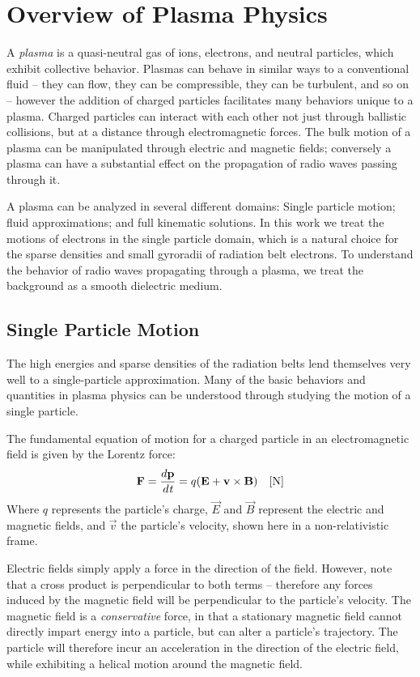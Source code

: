 \section{Overview of Plasma Physics}
A \emph{plasma} is a quasi-neutral gas of ions, electrons, and neutral particles, which exhibit collective behavior. Plasmas can behave in similar ways to a conventional fluid -- they can flow, they can be compressible, they can be turbulent, and so on -- however the addition of charged particles facilitates many behaviors unique to a plasma. Charged particles can interact with each other not just through ballistic collisions, but at a distance through electromagnetic forces. The bulk motion of a plasma can be manipulated through electric and magnetic fields; conversely a plasma can have a substantial effect on the propagation of radio waves passing through it. 

A plasma can be analyzed in several different domains: Single particle motion; fluid approximations; and full kinematic solutions. In this work we treat the motions of electrons in the single particle domain, which is a natural choice for the sparse densities and small gyroradii of radiation belt electrons. To understand the behavior of radio waves propagating through a plasma, we treat the background as a smooth dielectric medium. 

\subsection{Single Particle Motion}
\label{section:single_particle_motion}
The high energies and sparse densities of the radiation belts lend themselves very well to a single-particle approximation. Many of the basic behaviors and quantities in plasma physics can be understood through studying the motion of a single particle.

The fundamental equation of motion for a charged particle in an electromagnetic field is given by the Lorentz force:
\begin{equation}
\mathbf{F} = \frac{d\mathbf{p}}{d\emph{t}} = q(\mathbf{E} + \mathbf{v}\times\mathbf{B}) \quad[\mathrm{N}]
\label{eqn:lorentz_force}
\end{equation}
Where $q$ represents the particle's charge, $\vec{E}$ and $\vec{B}$ represent the electric and magnetic fields, and $\vec{v}$ the particle's velocity, shown here in a non-relativistic frame.

Electric fields simply apply a force in the direction of the field. However, note that a cross product is perpendicular to both terms -- therefore any forces induced by the magnetic field will be perpendicular to the particle's velocity. The magnetic field is a \emph{conservative} force, in that a stationary magnetic field cannot directly impart energy into a particle, but can alter a particle's trajectory. The particle will therefore incur an acceleration in the direction of the electric field, while exhibiting a helical motion around the magnetic field.

